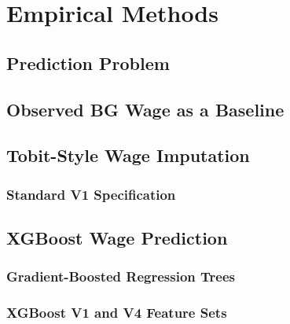 \documentclass[12pt,a4paper,oneside,titlepage]{book}
\newif\ifthesisdraft
\newcommand{\draftnote}[1]{%
  \ifthesisdraft
    \par\noindent\colorbox{yellow!20}{%
      \parbox{0.94\textwidth}{\textbf{Draft note:} #1}%
    }\par
  \fi
}
\begin{document}
\chapter{Empirical Methods}
\label{ch:methods}

\section{Prediction Problem}
\draftnote{Formalise the observed top-coded BG wage, the latent or true LZ wage, the prediction target, and the information set available when LZ is absent.}

\section{Observed BG Wage as a Baseline}
\draftnote{Define the uncorrected BG measure as a transparent benchmark and explain why it should perform well below the ceiling but underpredict censored wages.}

\section{Tobit-Style Wage Imputation}
\label{sec:tobit}

\subsection{Standard V1 Specification}
\draftnote{Present the classical Card-style specification and its assumptions. Document the interval-censored Gaussian model estimated with \texttt{survival::survreg}.}

\section{XGBoost Wage Prediction}
\label{sec:xgboost}

\subsection{Gradient-Boosted Regression Trees}
\draftnote{Explain the prediction function, loss, regularisation, and sequential tree construction at the level needed for the thesis.}

\subsection{XGBoost V1 and V4 Feature Sets}
\draftnote{Explain the restricted V1 and richer V4 predictor sets. Clearly exclude LZ-derived information from predictors and explain which wage-history and employment variables distinguish XGBoost V4.}
\end{document}
